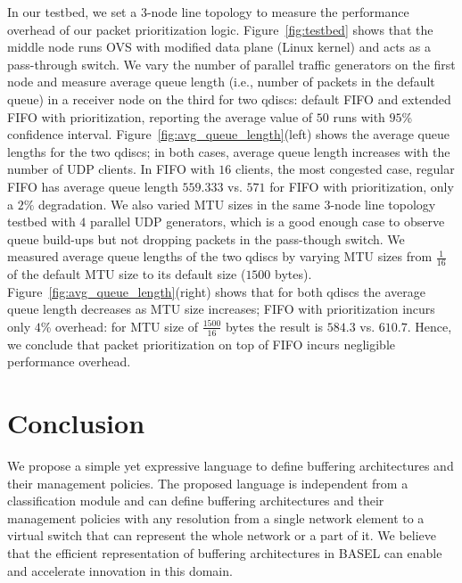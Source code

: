 \documentclass{article}
\newcommand{\barch}{BASEL}
\begin{document}
In our testbed, we set a 3-node line topology to measure the performance overhead of our packet prioritization logic. Figure~\ref{fig:testbed} shows that the middle node runs OVS with modified data plane
(Linux kernel) and acts as a pass-through switch. We vary the number of parallel traffic generators on the first node
and measure average queue length (i.e., number of packets in the default queue) in a receiver node on the third
for two qdiscs: default FIFO and extended FIFO with prioritization, reporting the average value of $50$ runs with
$95$\% confidence interval. Figure~\ref{fig:avg_queue_length}(left) shows the average queue lengths for the
two qdiscs; in both cases, average queue length increases with the number of UDP clients. In FIFO with $16$ clients,
the most congested case, regular FIFO has average queue length $559.333$ vs. $571$ for FIFO with prioritization,
only a $2\%$ degradation. 
We also varied MTU sizes in the same 3-node line topology testbed with $4$ parallel UDP generators, which is a good enough case to observe queue build-ups but not dropping packets in the pass-though switch. We measured average queue lengths of the two qdiscs by varying MTU sizes from $\frac1{16}$ of the default MTU size to its default size ($1500$ bytes). Figure~\ref{fig:avg_queue_length}(right) shows that for both qdiscs the average queue length decreases as MTU size increases; FIFO with prioritization incurs only $4$\% overhead: for MTU size of $\frac{1500}{16}$ bytes the result is $584.3$ vs. $610.7$. Hence, we conclude that packet prioritization on top of FIFO incurs negligible performance overhead.





\begin{figure} 
\end{figure}
















\vspace{-5pt}
\section{Conclusion}\label{sec:conclusion}
We propose a simple yet expressive language to define buffering architectures and their management policies. The proposed language is independent from a classification module and can define buffering architectures and their management policies with any resolution from a single network element to a virtual switch that can represent the whole network or a part of it. We believe that the efficient representation of buffering architectures in \barch{} can enable and accelerate innovation in this domain.
\end{document}
